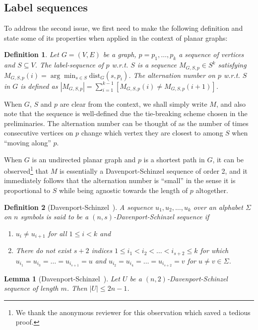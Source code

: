 \documentclass[a4paper,UKenglish,cleveref, autoref, thm-restate]{article}
\newtheorem{lemma}{Lemma}
\newtheorem{definition}{Definition}
\begin{document}
\subsection{Label sequences}
To address the second issue, we first need to make the following definition and state some of its properties when applied in the context of planar graphs:

\begin{definition}\label{def:interval}
Let $G=(V,E)$ be a graph, $p=p_1,\hdots,p_k$ a sequence of vertices and $S \subseteq V$. The \textit{label-sequence of $p$ w.r.t. $S$} is a sequence $M_{G,S,p} \in S^k$ satisfying $M_{G,S,p}(i) = \arg\min_{s \in S} \text{dist}_G(s,p_i)$. The \textit{alternation number} on $p$ w.r.t. $S$ in $G$ is defined as $|M_{G,S,p}| = \sum_{i=1}^{k-1} [M_{G,S,p}(i) \neq M_{G,S,p}(i+1)]$.
\end{definition}
When $G$, $S$ and $p$ are clear from the context, we shall simply write $M$, and also note that the sequence is well-defined due the tie-breaking scheme chosen in the preliminaries. The alternation number can be thought of as the number of times consecutive vertices on $p$ change which vertex they are closest to among $S$ when ``moving along'' $p$.

When $G$ is an undirected planar graph and $p$ is a shortest path in $G$, it can be observed\footnote{We thank the anonymous reviewer for this observation which saved a tedious proof.} that $M$ is essentially a Davenport-Schinzel sequence of order 2, and it immediately follows that the alternation number is ``small'' in the sense it is proportional to $S$ while being agnostic towards the length of $p$ altogether.

\begin{definition}[Davenport-Schinzel~\cite{Davenport1965}]\label{def:davenport}
A sequence $u_1, u_2, \hdots, u_k$ over an alphabet $\Sigma$ on $n$ symbols is said to be a $(n,s)$-Davenport-Schinzel sequence if
\begin{enumerate}
\item $u_i \neq u_{i+1}$ for all $1 \leq i < k$ and
\item There do not exist $s+2$ indices $1 \leq  i_1 < i_2 < \hdots < i_{s+2} \leq k$ for which $u_{i_1}=u_{i_3} = \hdots = u_{i_{s+1}} = u$ and $u_{i_2}=u_{i_4} = \hdots = u_{i_{s+2}} = v$ for  $u \neq v \in \Sigma$.
\end{enumerate}
\end{definition}

\begin{lemma}[Davenport-Schinzel~\cite{Davenport1965}]\label{lem:davenport}
Let $U$ be a $(n,2)$-Davenport-Schinzel sequence of length $m$. Then $|U| \leq 2n-1$.
\end{lemma}
\end{document}
